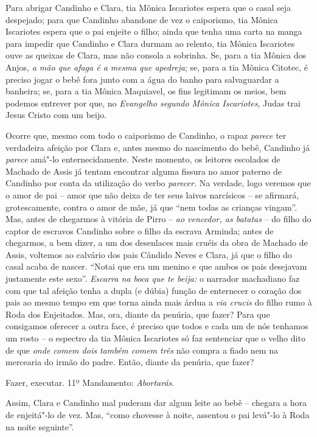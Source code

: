 Para abrigar Candinho e Clara, tia Mônica Iscariotes espera que o casal
seja despejado; para que Candinho abandone de vez o caiporismo, tia
Mônica Iscariotes espera que o pai enjeite o filho; ainda que tenha uma
carta na manga para impedir que Candinho e Clara durmam ao relento, tia
Mônica Iscariotes ouve as queixas de Clara, mas não consola a sobrinha.
Se, para a tia Mônica dos Anjos, \emph{a mão que afaga é a mesma que
apedreja}; se, para a tia Mônica Citotec, é preciso jogar o bebê fora
junto com a água do banho para salvaguardar a banheira; se, para a tia
Mônica Maquiavel, os fins legitimam os meios, bem podemos entrever por
que, no \emph{Evangelho segundo Mônica Iscariotes}, Judas trai Jesus
Cristo com um beijo.

Ocorre que, mesmo com todo o caiporismo de Candinho, o rapaz
\emph{parece} ter verdadeira afeição por Clara e, antes mesmo do
nascimento do bebê, Candinho já \emph{parece} amá"-lo enternecidamente.
Neste momento, os leitores escolados de Machado de Assis já tentam
encontrar alguma fissura no amor paterno de Candinho por conta da
utilização do verbo \emph{parecer.} Na verdade, logo veremos que o amor
de pai -- amor que não deixa de ter seus laivos narcísicos -- se
afirmará, grotescamente, contra o amor de mãe, já que ``nem todas as
crianças vingam''. Mas, antes de chegarmos à vitória de Pirro --
\emph{ao vencedor, as batatas} -- do filho do captor de escravos
Candinho sobre o filho da escrava Arminda; antes de chegarmos, a bem
dizer, a um dos desenlaces mais cruéis da obra de Machado de Assis,
voltemos ao calvário dos pais Cândido Neves e Clara, já que o filho do
casal acaba de nascer. ``Notai que era um menino e que ambos os pais
desejavam justamente este sexo''. \emph{Escarra na boca que te beija:} o
narrador machadiano faz com que tal afeição tenha a dupla (e dúbia)
função de enternecer o coração dos pais ao mesmo tempo em que torna
ainda mais árdua a \emph{via crucis} do filho rumo à Roda dos
Enjeitados. Mas, ora, diante da penúria, que fazer? Para que consigamos
oferecer a outra face, é preciso que todos e cada um de nós tenhamos um
rosto -- o espectro da tia Mônica Iscariotes só faz sentenciar que o
velho dito de que \emph{onde comem dois também comem três} não compra a
fiado nem na mercearia do irmão do padre. Então, diante da penúria, que
fazer?

Fazer, executar. 11º Mandamento: \emph{Abortarás. }

Assim, Clara e Candinho mal puderam dar algum leite ao bebê -- chegara a
hora de enjeitá"-lo de vez. Mas, ``como chovesse à noite, assentou o pai
levá"-lo à Roda na noite seguinte''.

